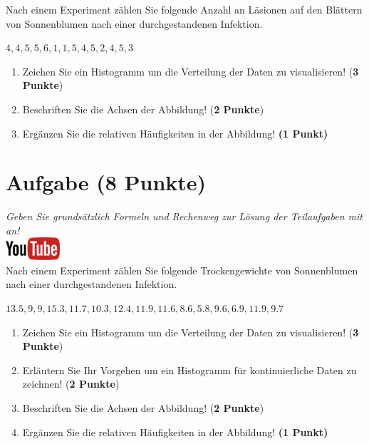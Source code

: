 \documentclass[a4paper, 10pt]{scrartcl}\usepackage[]{graphicx}\usepackage[]{xcolor}
\begin{document}
Nach einem Experiment z{\"a}hlen Sie folgende Anzahl an L{\"a}sionen auf den
Bl{\"a}ttern von Sonnenblumen nach einer durchgestandenen Infektion. 

\begin{center}
$4, 4, 5, 5, 6, 1, 1, 5, 4, 5, 2, 4, 5, 3$
\end{center}

\begin{enumerate}
\item Zeichen Sie ein Histogramm um die Verteilung der Daten zu visualisieren! (\textbf{3 Punkte})
\item Beschriften Sie die Achsen der Abbildung! (\textbf{2 Punkte})
\item Erg{\"a}nzen Sie die relativen H{\"a}ufigkeiten in der Abbildung! \textbf{(1
    Punkt)}  
\end{enumerate}

 
\clearpage

\section{Aufgabe \hfill (8 Punkte)}

\textit{Geben Sie grunds{\"a}tzlich Formeln und Rechenweg zur L{\"o}sung der
  Teilaufgaben mit an!} \\[1Ex]

\hfill\href{https://youtu.be/ORHSPTCdfeY}{\includegraphics[width =
  2cm]{img/youtube}}\\[1Ex]



Nach einem Experiment z{\"a}hlen Sie folgende Trockengewichte von Sonnenblumen nach einer durchgestandenen Infektion. 

\begin{center}
$13.5, 9, 9, 15.3, 11.7, 10.3, 12.4, 11.9, 11.6, 8.6, 5.8, 9.6, 6.9, 11.9, 9.7$
\end{center}

\begin{enumerate}
\item Zeichen Sie ein Histogramm um die Verteilung der Daten zu
  visualisieren! (\textbf{3 Punkte})
 \item Erl{\"a}utern Sie Ihr Vorgehen um ein Histogramm f{\"u}r kontinuierliche
  Daten zu zeichnen!  (\textbf{2 Punkte})
\item Beschriften Sie die Achsen der Abbildung! (\textbf{2 Punkte})
\item Erg{\"a}nzen Sie die relativen H{\"a}ufigkeiten in der Abbildung! \textbf{(1
    Punkt)}  
\end{enumerate}
\end{document}

